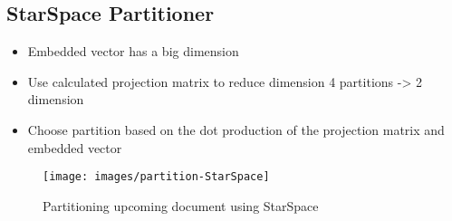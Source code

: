 \subsection{StarSpace Partitioner}
\label{subsec:partitioning-star-space}

\begin{itemize}
    \item Embedded vector has a big dimension

    \item Use calculated projection matrix to reduce dimension
    4 partitions -> 2 dimension
    
    \item Choose partition based on the dot production of the projection matrix and embedded vector
    
\end{itemize}




\begin{figure}[!h]
	\centering
	\texttt{[image: images/partition-StarSpace]}
	\caption{Partitioning upcoming document using StarSpace}
	\label{fig:star-space-partitioning}
\end{figure}
